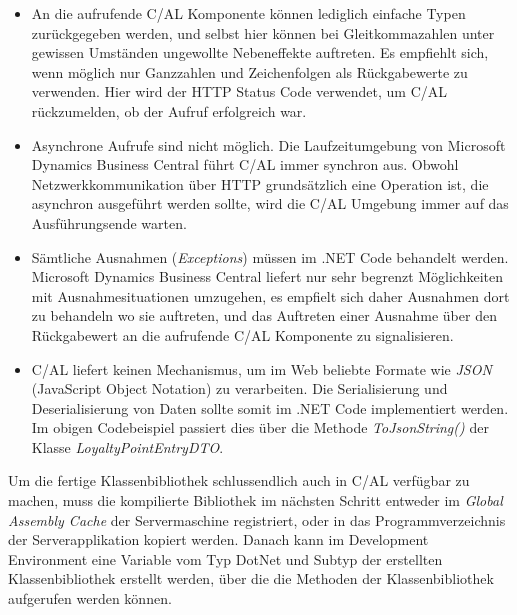 \begin{itemize}
	\item An die aufrufende C/AL Komponente können lediglich einfache Typen zurückgegeben werden, und selbst hier können bei Gleitkommazahlen unter gewissen Umständen ungewollte Nebeneffekte auftreten. Es empfiehlt sich, wenn möglich nur Ganzzahlen und Zeichenfolgen als Rückgabewerte zu verwenden. Hier wird der HTTP Status Code verwendet, um C/AL rückzumelden, ob der Aufruf erfolgreich war.
	\item Asynchrone Aufrufe sind nicht möglich. Die Laufzeitumgebung von Microsoft Dynamics Business Central führt C/AL immer synchron aus. Obwohl Netzwerkkommunikation über HTTP grundsätzlich eine Operation ist, die asynchron ausgeführt werden sollte, wird die C/AL Umgebung immer auf das Ausführungsende warten.
	\item Sämtliche Ausnahmen (\textit{Exceptions}) müssen im .NET Code behandelt werden. Microsoft Dynamics Business Central liefert nur sehr begrenzt Möglichkeiten mit Ausnahmesituationen umzugehen, es empfielt sich daher Ausnahmen dort zu behandeln wo sie auftreten, und das Auftreten einer Ausnahme über den Rückgabewert an die aufrufende C/AL Komponente zu signalisieren.
	\item C/AL liefert keinen Mechanismus, um im Web beliebte Formate wie \textit{JSON} (JavaScript Object Notation) zu verarbeiten. Die Serialisierung und Deserialisierung von Daten sollte somit im .NET Code implementiert werden. Im obigen Codebeispiel passiert dies über die Methode \textit{ToJsonString()} der Klasse \textit{LoyaltyPointEntryDTO}. 
\end{itemize}

Um die fertige Klassenbibliothek schlussendlich auch in C/AL verfügbar zu machen, muss die kompilierte Bibliothek im nächsten Schritt entweder im \textit{Global Assembly Cache}  der Servermaschine registriert, oder in das Programmverzeichnis der Serverapplikation kopiert werden. Danach kann im Development Environment eine Variable vom Typ DotNet und Subtyp der erstellten Klassenbibliothek erstellt werden, über die die Methoden der Klassenbibliothek aufgerufen werden können.

